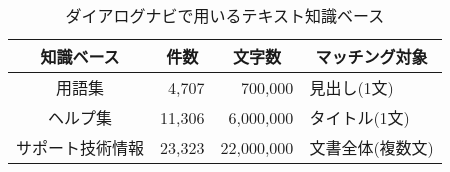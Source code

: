 \begin{table}
 \caption{ダイアログナビで用いるテキスト知識ベース}
 \label{tab:text_collection}
 \begin{center} \footnotesize
  \begin{tabular}{c|rrl} \hline
   知識ベース & \multicolumn{1}{c}{件数} &
   \multicolumn{1}{c}{文字数} & \multicolumn{1}{c}{マッチング対象} \\ \hline
   用語集           & 4,707  & 700,000    & 見出し(1文) \\
   ヘルプ集         & 11,306 & 6,000,000  & タイトル(1文) \\
   サポート技術情報 & 23,323 & 22,000,000 & 文書全体(複数文) \\ \hline
  \end{tabular}
 \end{center}
\end{table}

